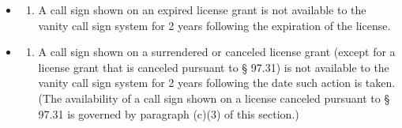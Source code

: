 \documentclass[
  letterpaper,
  DIV=11,
  numbers=noendperiod]{scrreport}
\providecommand{\tightlist}{%
  \setlength{\itemsep}{0pt}\setlength{\parskip}{0pt}}\usepackage{longtable,booktabs,array}
\begin{document}
\begin{itemize}
\item
  \begin{enumerate}
  \def\labelenumi{(\arabic{enumi})}
  \tightlist
  \item
    A call sign shown on an expired license grant is not available to
    the vanity call sign system for 2 years following the expiration of
    the license.
  \end{enumerate}
\item
  \begin{enumerate}
  \def\labelenumi{(\arabic{enumi})}
  \setcounter{enumi}{1}
  \tightlist
  \item
    A call sign shown on a surrendered or canceled license grant (except
    for a license grant that is canceled pursuant to § 97.31) is not
    available to the vanity call sign system for 2 years following the
    date such action is taken. (The availability of a call sign shown on
    a license canceled pursuant to § 97.31 is governed by paragraph
    (c)(3) of this section.)
  \end{enumerate}


\end{itemize}
\end{document}
